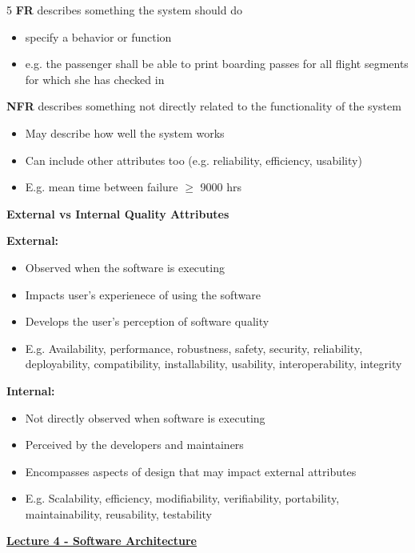 \documentclass[landscape,a4paper]{extarticle}
\begin{document}
\begin{multicols*}{5}
    \textbf{FR} describes something the system should do
    \begin{itemize}
        \item specify a behavior or function
        \item e.g. the passenger shall be able to print boarding passes for all flight segments for which she has checked in
    \end{itemize}
    \textbf{NFR} describes something not directly related to the functionality of the system
    \begin{itemize}
        \item May describe how well the system works
        \item Can include other attributes too (e.g. reliability, efficiency, usability)
        \item E.g. mean time between failure $\geq$ 9000 hrs
    \end{itemize}

    \textbf{External vs Internal Quality Attributes}

    \textbf{External:}

    \begin{itemize}
        \item Observed when the software is executing
        \item Impacts user's experienece of using the software
        \item Develops the user's perception of software quality
        \item E.g. Availability, performance, robustness, safety, security, reliability, deployability, compatibility, installability, usability, interoperability, integrity
    \end{itemize}

    \textbf{Internal:}

    \begin{itemize}
        \item Not directly observed when software is executing
        \item Perceived by the developers and maintainers
        \item Encompasses aspects of design that may impact external attributes
        \item E.g. Scalability, efficiency, modifiability, verifiability, portability, maintainability, reusability, testability
    \end{itemize}

    \uline{\textbf{Lecture 4 - Software Architecture}}


\end{multicols*}
\end{document}
